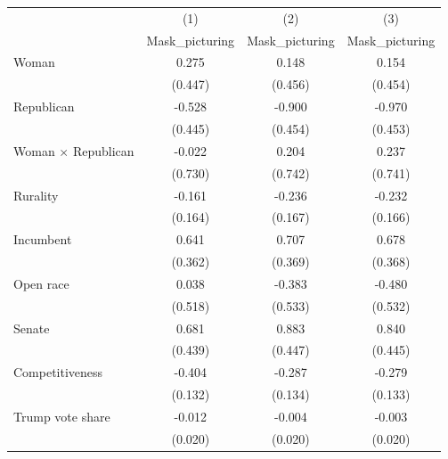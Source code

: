 \begin{tabular}{l*{3}{c}}
\toprule
                    &\multicolumn{1}{c}{(1)}&\multicolumn{1}{c}{(2)}&\multicolumn{1}{c}{(3)}\\
                    &\multicolumn{1}{c}{Mask\_picturing}&\multicolumn{1}{c}{Mask\_picturing}&\multicolumn{1}{c}{Mask\_picturing}\\
\midrule
Woman &       0.275         &       0.148         &       0.154         \\
                    &     (0.447)         &     (0.456)         &     (0.454)         \\
Republican    &      -0.528         &      -0.900\sym{*}  &      -0.970\sym{*}  \\
                    &     (0.445)         &     (0.454)         &     (0.453)         \\
Woman $\times$ Republican&      -0.022         &       0.204         &       0.237         \\
                    &     (0.730)         &     (0.742)         &     (0.741)         \\
Rurality      &      -0.161         &      -0.236         &      -0.232         \\
                    &     (0.164)         &     (0.167)         &     (0.166)         \\
Incumbent                   &       0.641         &       0.707         &       0.678         \\
                    &     (0.362)         &     (0.369)         &     (0.368)         \\
Open race                   &       0.038         &      -0.383         &      -0.480         \\
                    &     (0.518)         &     (0.533)         &     (0.532)         \\
Senate              &       0.681         &       0.883\sym{*}  &       0.840         \\
                    &     (0.439)         &     (0.447)         &     (0.445)         \\
Competitiveness &      -0.404\sym{**} &      -0.287\sym{*}  &      -0.279\sym{*}  \\
                    &     (0.132)         &     (0.134)         &     (0.133)         \\
Trump vote share              &      -0.012         &      -0.004         &      -0.003         \\
                    &     (0.020)         &     (0.020)         &     (0.020)         \\

\end{tabular}
